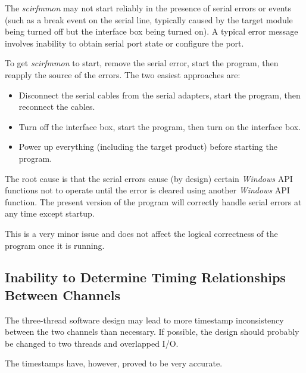 \documentclass[letterpaper,10pt,titlepage]{article}
\newcommand{\productname}{scirfmmon}
\newcommand{\productnameemph}{\emph{\productname}}
\begin{document}
The \productnameemph{} may not start reliably in the presence of serial
errors or events (such as a break event on the serial line, typically
caused by the target module being turned off but the interface box being turned
on).  
A typical error message involves inability to 
obtain serial port state or configure the port.

To get \productnameemph{} to start, remove the serial error, start the
program, then reapply the source of the errors.  The two easiest approaches
are:

\begin{itemize}
\item Disconnect the serial cables from the serial adapters, start the program,
      then reconnect the cables.
\item Turn off the interface box, start the program, then turn on the interface box.
\item Power up everything (including the target product) before starting the
      program.
\end{itemize} 

The root cause is that the serial errors cause (by design) certain 
\emph{Windows} API functions not to operate until the error is cleared using
another \emph{Windows} API function.  The present version of the program will
correctly handle serial errors at any time except startup.

This is a very minor issue and does not affect the logical correctness
of the program once it is running.


\subsection{Inability to Determine Timing Relationships Between Channels}
\label{skli0:itr0}

The three-thread software design may lead to more timestamp inconsistency
between the two channels than necessary.  If possible, the design should probably
be changed to two threads and overlapped I/O.

The timestamps have, however, proved to be very accurate.


\end{document}
